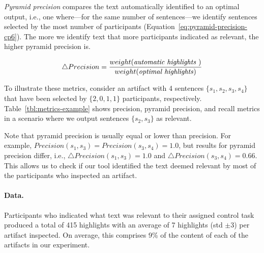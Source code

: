 \medskip


\textit{Pyramid precision} compares the text automatically identified to an optimal output, i.e., one where---for the same number of sentences---we identify sentences selected by the most number of participants (Equation~\ref{eq:pyramid-precision-cp6}). The more we identify text that more participants indicated as relevant, the higher pyramid precision is.



\smallskip
\begin{small}
\begin{equation}
    \triangle Precision = \frac{
        weight(\text{\textit{automatic highlights}~})
    }{weight(\text{\textit{optimal highlights}})}
\label{eq:pyramid-precision-cp6}    
\end{equation}
\end{small}
    


To illustrate these metrics, consider an artifact with 4 sentences $\{s_1, s_2, s_3, s_4\}$ that have been selected by $\{2, 0, 1, 1\}$ participants, respectively.
Table~\ref{tbl:metrics-example} shows precision, pyramid precision, and recall metrics in a scenario where we output sentences $\{s_2, s_3\}$ as relevant.
    





Note that pyramid precision is usually equal or lower than precision. For example, $Precision(s_1, s_3) = Precision(s_3, s_4) = 1.0$, but 
results for pyramid precision differ, i.e., 
$\triangle Precision(s_1, s_3) = 1.0$ and $\triangle Precision(s_3, s_4) = 0.66$. This allows us to check if our tool 
identified the text deemed relevant by most of the participants who inspected an artifact.



\paragraph{\textbf{Data.}}

Participants who indicated what text was relevant to their assigned control task produced a total of 415 highlights with an average of 7 highlights (std $\pm 3$) per artifact inspected.
On average, this comprises 9\% of the content of each of the artifacts in our experiment. 


